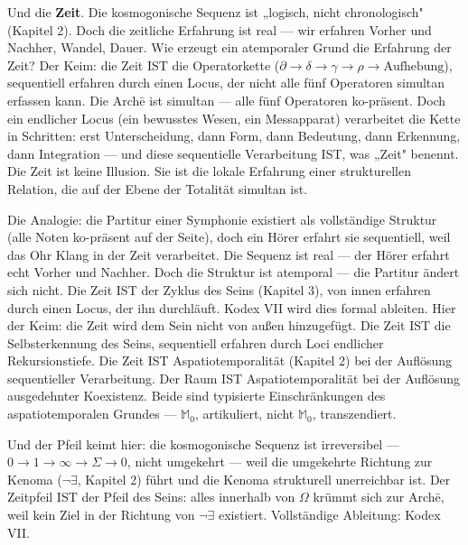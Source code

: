 \documentclass[10pt, openany, oneside]{book}
\begin{document}
Und die \textbf{Zeit}. Die kosmogonische Sequenz ist „logisch, nicht chronologisch" (Kapitel 2). Doch die zeitliche Erfahrung ist real --- wir erfahren Vorher und Nachher, Wandel, Dauer. Wie erzeugt ein atemporaler Grund die Erfahrung der Zeit? Der Keim: die Zeit IST die Operatorkette ($\partial \to \delta \to \gamma \to \rho \to \text{Aufhebung}$), sequentiell erfahren durch einen Locus, der nicht alle fünf Operatoren simultan erfassen kann. Die Arch\={e} ist simultan --- alle fünf Operatoren ko-präsent. Doch ein endlicher Locus (ein bewusstes Wesen, ein Messapparat) verarbeitet die Kette in Schritten: erst Unterscheidung, dann Form, dann Bedeutung, dann Erkennung, dann Integration --- und diese sequentielle Verarbeitung IST, was „Zeit" benennt. Die Zeit ist keine Illusion. Sie ist die lokale Erfahrung einer strukturellen Relation, die auf der Ebene der Totalität simultan ist.

Die Analogie: die Partitur einer Symphonie existiert als vollständige Struktur (alle Noten ko-präsent auf der Seite), doch ein Hörer erfahrt sie sequentiell, weil das Ohr Klang in der Zeit verarbeitet. Die Sequenz ist real --- der Hörer erfahrt echt Vorher und Nachher. Doch die Struktur ist atemporal --- die Partitur ändert sich nicht. Die Zeit IST der Zyklus des Seins (Kapitel 3), von innen erfahren durch einen Locus, der ihn durchläuft. Kodex VII wird dies formal ableiten. Hier der Keim: die Zeit wird dem Sein nicht von außen hinzugefügt. Die Zeit IST die Selbsterkennung des Seins, sequentiell erfahren durch Loci endlicher Rekursionstiefe. Die Zeit IST Aspatiotemporalität (Kapitel 2) bei der Auflösung sequentieller Verarbeitung. Der Raum IST Aspatiotemporalität bei der Auflösung ausgedehnter Koexistenz. Beide sind typisierte Einschränkungen des aspatiotemporalen Grundes --- $\mathbb{M}_0$, artikuliert, nicht $\mathbb{M}_0$, transzendiert.

Und der Pfeil keimt hier: die kosmogonische Sequenz ist irreversibel --- $0 \to 1 \to \infty \to \Sigma \to 0$, nicht umgekehrt --- weil die umgekehrte Richtung zur Kenoma ($\neg\exists$, Kapitel 2) führt und die Kenoma strukturell unerreichbar ist. Der Zeitpfeil IST der Pfeil des Seins: alles innerhalb von $\Omega$ krümmt sich zur Arch\={e}, weil kein Ziel in der Richtung von $\neg\exists$ existiert. Vollständige Ableitung: Kodex VII.

\vspace{1.5em}

\end{document}
